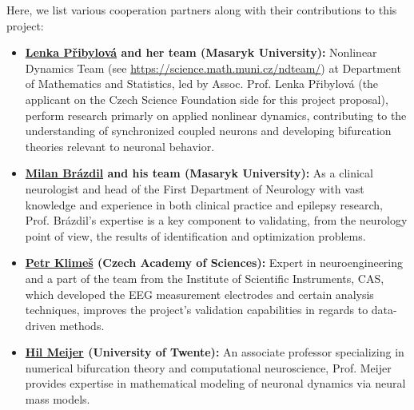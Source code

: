 \documentclass[a4paper,11pt]{scrartcl}
\begin{document}
Here, we list various cooperation partners along with their contributions to this project:
\begin{itemize}
    \item \textbf{\href{https://orcid.org/0000-0002-9027-4333}{Lenka Přibylová} and her team (Masaryk University):} Nonlinear Dynamics Team (see \url{https://science.math.muni.cz/ndteam/}) at Department of Mathematics and Statistics, led by Assoc. Prof. Lenka Přibylová (the applicant on the Czech Science Foundation side for this project proposal), perform research primarly on applied nonlinear dynamics, contributing to the understanding of synchronized coupled neurons and developing bifurcation theories relevant to neuronal behavior.
    \item \textbf{\href{https://orcid.org/0000-0001-7979-2343}{Milan Brázdil} and his team (Masaryk University):} As a clinical neurologist and head of the First Department of Neurology with vast knowledge and experience in both clinical practice and epilepsy research, Prof. Brázdil's expertise is a key component to validating, from the neurology point of view, the results of identification and optimization problems.
    \item \textbf{\href{https://orcid.org/0000-0002-0232-9518}{Petr Klimeš} (Czech Academy of Sciences):} Expert in neuroengineering and a part of the team from the Institute of Scientific Instruments, CAS, which developed the EEG measurement electrodes and certain analysis techniques, improves the project's validation capabilities in regards to data-driven methods.
    \item \textbf{\href{https://orcid.org/0000-0003-1526-3762}{Hil Meijer} (University of Twente):} An associate professor specializing in numerical bifurcation theory and computational neuroscience, Prof. Meijer provides expertise in mathematical modeling of neuronal dynamics via neural mass models.
\end{itemize}

\end{document}

